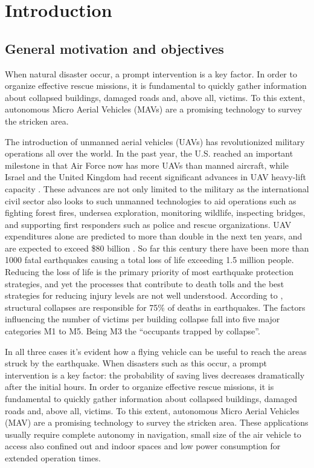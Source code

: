 \chapter{Introduction}

\section{General motivation and objectives}

When natural disaster occur, a prompt intervention is a key factor. In order to organize effective rescue missions, it is fundamental to quickly gather information about collapsed buildings, damaged roads and, above all, victims. To this extent, autonomous Micro Aerial Vehicles (MAVs) are a promising technology to survey the stricken area.

The introduction of unmanned aerial vehicles (UAVs) has revolutionized military operations all over the world. In the past year, the U.S. reached an important milestone in that Air Force now has more UAVs than manned aircraft, while Israel and the United Kingdom had recent significant advances in UAV heavy-lift capacity \cite{6099676}. These advances are not only limited to the military as the international civil sector also looks to such unmanned technologies to aid operations such as fighting forest fires, undersea exploration, monitoring wildlife, inspecting bridges, and supporting first responders such as police and rescue organizations. UAV expenditures alone are predicted to more than double in the next ten years, and are expected to exceed \$80 billion \cite{6099676}.
So far this century there have been more than 1000 fatal earthquakes causing a total loss of life exceeding 1.5 million people. Reducing the loss of life is the primary priority of most earthquake protection strategies, and yet the processes that contribute to death tolls and the best strategies for reducing injury levels are not well understood. According to \cite{coburn1994death}, structural collapses are responsible for 75\% of deaths in earthquakes. The factors influencing the number of victims per building collapse fall into five major categories M1 to M5. Being M3 the “occupants trapped by collapse”.

In all three cases it’s evident how a flying vehicle can be useful to reach the areas struck by the earthquake. When disasters such as this occur, a prompt intervention is a key factor: the probability of saving lives decreases dramatically after the initial hours. In order to organize effective rescue missions, it is fundamental to quickly gather information about collapsed buildings, damaged roads and, above all, victims. To this extent, autonomous Micro Aerial Vehicles (MAV) are a promising technology to survey the stricken area. 
These applications usually require complete autonomy in navigation, small size of the air vehicle to access also confined out and indoor spaces and low power consumption for extended operation times. 


